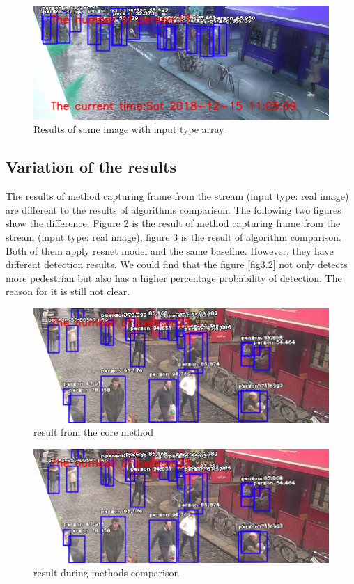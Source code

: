 \documentclass[runningheads]{llncs}
\begin{document}
\begin{figure}

	\includegraphics[width=\textwidth]{figs/problem_imgtype2.png}
	\caption{Results of same image with input type array} \label{fig3}
\end{figure}

\subsection{Variation of the results}
The results of method capturing frame from the stream (input type: real image) are different to the results of algorithms comparison. The following two figures show the difference. Figure \ref{fig4} is the result of method capturing frame from the stream (input type: real image), figure \ref{fig5} is the result of algorithm comparison. Both of them apply resnet model and the same baseline. However, they have different detection results. We could find that the figure \ref{fig3.2} not only detects more pedestrian but also has a higher percentage probability of detection. The reason for it is still not clear.  
\begin{figure}
\includegraphics[width=\textwidth]{figs/problem_variant2.png}
\caption{result from the core method} \label{fig4}
\end{figure}

\begin{figure}
	\includegraphics[width=\textwidth]{figs/problem_variant2.png}
	\caption{result during methods comparison} \label{fig5}
\end{figure}
\end{document}
